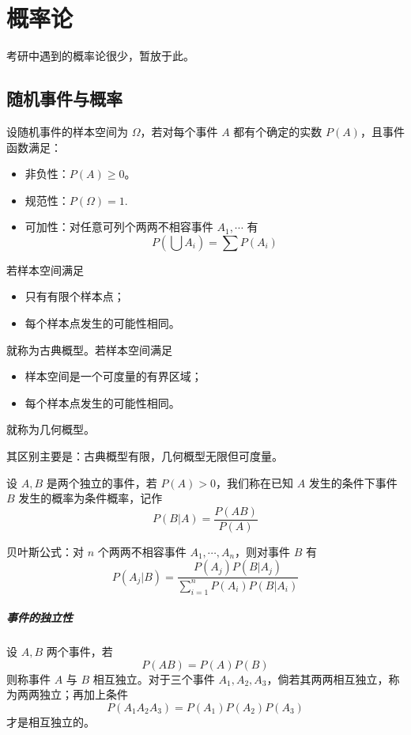 \chapter{概率论}

考研中遇到的概率论很少，暂放于此。

\section{随机事件与概率}

设随机事件的样本空间为 $\Omega$，若对每个事件 $A$ 都有个确定的实数 $P(A)$，且事件函数满足：

\begin{itemize}
	\item 非负性：$P(A) \geqslant 0$。
	\item 规范性：$P(\Omega) = 1$.
	\item 可加性：对任意可列个两两不相容事件 $A_1, \cdots$ 有
	      \[ P\left(\bigcup A_i\right) = \sum P(A_i) \]
\end{itemize}

若样本空间满足
\begin{itemize}
	\item 只有有限个样本点；
	\item 每个样本点发生的可能性相同。
\end{itemize}
就称为古典概型。若样本空间满足
\begin{itemize}
	\item 样本空间是一个可度量的有界区域；
	\item 每个样本点发生的可能性相同。
\end{itemize}
就称为几何概型。

其区别主要是：古典概型有限，几何概型无限但可度量。

设 $A,B$ 是两个独立的事件，若 $P(A) > 0$，我们称在已知 $A$ 发生的条件下事件 $B$ 发生的概率为条件概率，记作
\[ P(B | A) = \frac{P(AB)}{P(A)} \]

贝叶斯公式：对 $n$ 个两两不相容事件 $A_1, \cdots, A_n$，则对事件 $B$ 有
\[ P\left(A_j | B\right) = \frac{P(A_j)P(B | A_j)}{\sum\limits_{i=1}^n P(A_i)P(B | A_i) } \]

\paragraph{事件的独立性} 设 $A,B$ 两个事件，若
\[ P(AB) = P(A)P(B) \]
则称事件 $A$ 与 $B$ 相互独立。对于三个事件 $A_1, A_2, A_3$，倘若其两两相互独立，称为两两独立；再加上条件
\[ P(A_1 A_2 A_3) = P(A_1)P(A_2)P(A_3) \]
才是相互独立的。

